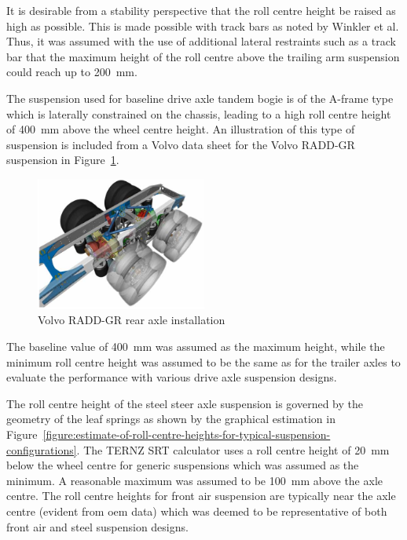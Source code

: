 It is desirable from a stability perspective that the roll centre height be raised as high as possible. This is made possible with track bars as noted by Winkler et al. Thus, it was assumed with the use of additional lateral restraints such as a track bar that the maximum height of the roll centre above the trailing arm suspension could reach up to 200~mm.

The suspension used for baseline drive axle tandem bogie is of the A-frame type which  is laterally constrained on the chassis, leading to a high roll centre height of 400~mm above the wheel centre height. An illustration of this type of suspension is included from a Volvo data sheet for the Volvo RADD-GR \cite{VolvoTruckCorporation2012} suspension in Figure~\ref{figure:volvo-radd-gr-rear-axle-installation}.

\begin{figure}[H]
	\centering
	\includegraphics[width=0.5\textwidth]{fig/volvo_radd-gr-bogie-drive-axle-suspension}
	\caption{Volvo RADD-GR rear axle installation}
	\label{figure:volvo-radd-gr-rear-axle-installation}
\end{figure}

The baseline value of 400~mm was assumed as the maximum height, while the minimum roll centre height was assumed to be the same as for the trailer axles to evaluate the performance with various drive axle suspension designs.

The roll centre height of the steel steer axle suspension is governed by the geometry of the leaf springs as shown by the graphical estimation in Figure~\ref{figure:estimate-of-roll-centre-heights-for-typical-suspension-configurations}. The TERNZ SRT calculator \cite{TERNZTransportResearch} uses a roll centre height of 20~mm below the wheel centre for generic suspensions which was assumed as the minimum. A reasonable maximum was assumed to be 100~mm above the axle centre. The roll centre heights for front air suspension are typically near the axle centre (evident from \gls{oem} data) which was deemed to be representative of both front air and steel suspension designs.

